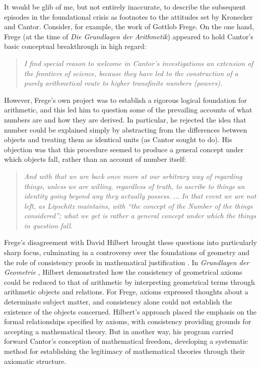 \documentclass{article}
\begin{document}
It would be glib of me, but not entirely inaccurate, to describe the subsequent episodes in the foundational crisis as footnotes to the 
attitudes set by Kronecker and Cantor. Consider, for example, the work of Gottlob Frege. On the one hand, Frege (at the time 
of \textit{Die Grundlagen der Arithmetik}) appeared to hold Cantor's basic conceptual breakthrough in high regard:
\begin{quote}
    \textit{I find special reason to welcome in Cantor's investigations an extension of the frontiers of science, because they have 
    led to the construction of a purely arithmetical route to higher transfinite numbers (powers).} \textit{\parencite[\S~86]{frege1884,frege1950}}
\end{quote}
However, Frege's own project was to establish a rigorous logical foundation for arithmetic, and this led him to question 
some of the prevailing accounts of what numbers are and how they are derived. In particular, he rejected the idea that 
number could be explained simply by abstracting from the differences between objects and treating them as identical units (as 
Cantor sought to do). His objection was that this procedure seemed to produce a general concept under which objects fall, 
rather than an account of number itself:
\begin{quote}
\textit{And with that we are back once more at our arbitrary way of regarding things, unless we are willing, regardless 
of truth, to ascribe to things an identity going beyond any they actually possess.} ...
\textit{In that event we are not left, as Lipschitz maintains, with ``the concept of the Number of the things considered''; 
what we get is rather a general concept under which the things in question fall.} \textit{\parencite[\S~34]{frege1884,frege1950}}
\end{quote}
Frege's disagreement with David Hilbert brought these questions into particularly sharp focus, culminating in a controversy 
over the foundations of geometry and the role of consistency proofs in mathematical justification \textit{\parencite{frege1980}}. In 
\textit{Grundlagen der Geometrie} \textit{\parencite{hilbert1899}}, Hilbert demonstrated how the consistency of geometrical axioms could be reduced to 
that of arithmetic by interpreting geometrical terms through arithmetic objects and relations. For Frege, axioms 
expressed thoughts about a determinate subject matter, and consistency alone could not establish the existence of the 
objects concerned. Hilbert's approach placed the emphasis on the formal relationships specified by axioms, with 
consistency providing grounds for accepting a mathematical theory. But in another way, his program carried forward Cantor's 
conception of mathematical freedom, developing a systematic method for establishing the legitimacy of mathematical 
theories through their axiomatic structure.
\end{document}

